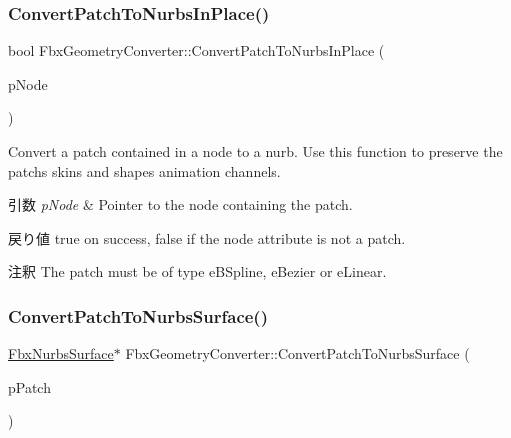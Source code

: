 \subsubsection{\texorpdfstring{Convert\+Patch\+To\+Nurbs\+In\+Place()}{ConvertPatchToNurbsInPlace()}}
{\footnotesize\ttfamily bool Fbx\+Geometry\+Converter\+::\+Convert\+Patch\+To\+Nurbs\+In\+Place (\begin{DoxyParamCaption}\item[{\hyperlink{class_fbx_node}{Fbx\+Node} $\ast$}]{p\+Node }\end{DoxyParamCaption})}

Convert a patch contained in a node to a nurb. Use this function to preserve the patch\textquotesingle{}s skins and shapes animation channels. 
\begin{DoxyParams}{引数}
{\em p\+Node} & Pointer to the node containing the patch. \\
\hline
\end{DoxyParams}
\begin{DoxyReturn}{戻り値}
{\ttfamily true} on success, {\ttfamily false} if the node attribute is not a patch. 
\end{DoxyReturn}
\begin{DoxyRemark}{注釈}
The patch must be of type e\+B\+Spline, e\+Bezier or e\+Linear. 
\end{DoxyRemark}
\mbox{\label{class_fbx_geometry_converter_a8c29f94bf91e84d6ee4e665ed9632e09}} 
\subsubsection{\texorpdfstring{Convert\+Patch\+To\+Nurbs\+Surface()}{ConvertPatchToNurbsSurface()}}
{\footnotesize\ttfamily \hyperlink{class_fbx_nurbs_surface}{Fbx\+Nurbs\+Surface}$\ast$ Fbx\+Geometry\+Converter\+::\+Convert\+Patch\+To\+Nurbs\+Surface (\begin{DoxyParamCaption}\item[{\hyperlink{class_fbx_patch}{Fbx\+Patch} $\ast$}]{p\+Patch }\end{DoxyParamCaption})}

